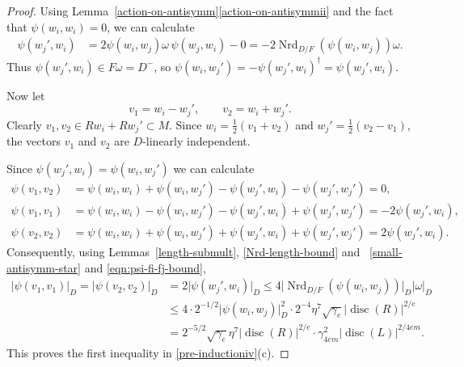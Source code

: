 \documentclass[JEP,XML,SOM,Unicode,NoFloatCountersInSection]{cedram}
\DeclareMathOperator{\disc}{disc}
\DeclareMathOperator{\Nrd}{Nrd}
\newcommand{\abs}[1]{\lvert #1 \rvert}
\begin{document}
\begin{proof}
Using Lemma~\ref{action-on-antisymm}\eqref{action-on-antisymmii} and the fact that $\psi(w_i, w_i) = 0$, we can calculate
\begin{align*}
\psi(w_j', w_i)
& = 2 \psi(w_i, w_j) \omega \, \psi(w_j, w_i) - 0
= -2 \Nrd_{D/F}(\psi(w_i, w_j))\omega.
\end{align*}
Thus $\psi(w_j', w_i) \in F\omega = D^-$, so $\psi(w_i, w_j') = -\psi(w_j', w_i)^\dag = \psi(w_j', w_i)$.

Now let
\[
v_1 = w_i - w_j', \qquad v_2 = w_i + w_j'.
\]
Clearly $v_1, v_2 \in Rw_i + Rw_j' \subset M$.
Since $w_i = \frac{1}{2}(v_1 + v_2)$ and $w_j' = \frac{1}{2}(v_2 - v_1)$, the vectors $v_1$ and $v_2$ are $D$-linearly independent.

Since $\psi(w_j', w_i) = \psi(w_i, w_j')$ we can calculate
\begin{align*}
\psi(v_1, v_2)
& = \psi(w_i, w_i) + \psi(w_i, w_j') - \psi(w_j', w_i) - \psi(w_j', w_j')
= 0,
\\ \psi(v_1, v_1)
& = \psi(w_i, w_i) - \psi(w_i, w_j') - \psi(w_j', w_i) + \psi(w_j', w_j')
= -2\psi(w_j', w_i),
\\ \psi(v_2, v_2)
& = \psi(w_i, w_i) + \psi(w_i, w_j') + \psi(w_j', w_i) + \psi(w_j', w_j')
= 2\psi(w_j', w_i).
\end{align*}
Consequently, using Lemmas~\ref{length-submult}, \ref{Nrd-length-bound} and~ \ref{small-antisymm-star} and \eqref{eqn:psi-fi-fj-bound},
\begin{align*}
\abs{\psi(v_1, v_1)}_D = \abs{\psi(v_2, v_2)}_D
& = 2\abs{\psi(w_j', w_i)}_D
\leq 4 \abs{\Nrd_{D/F}(\psi(w_i, w_j))}_D \abs{\omega}_D
\\& \leq 4 \cdot 2^{-1/2} \abs{\psi(w_i, w_j)}_D^2 \cdot 2^{-4} \eta^7 \sqrt{\gamma_e} \abs{\disc(R)}^{2/e}
\\& = 2^{-5/2} \sqrt{\gamma_e} \eta^7 \abs{\disc(R)}^{2/e} \cdot \gamma_{4em}^2 \abs{\disc(L)}^{2/4em}.
\end{align*}
This proves the first inequality in \eqref{pre-inductioniv}(c).


\end{proof}
\end{document}
